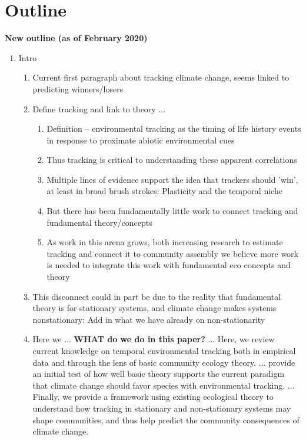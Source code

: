 \documentclass[11pt,letterpaper]{article}
\begin{document}
\newpage
\section{Outline}


{\bf New outline (as of February 2020)} 
\begin{enumerate}
\item Intro
\begin{enumerate}
\item Current first paragraph about tracking climate change, seems linked to predicting winners/losers 
\item Define tracking and link to theory ... 
\begin{enumerate}
\item Definition -- environmental tracking as the timing of life history events in response to proximate abiotic environmental cues \item Thus tracking is critical to understanding these apparent correlations
\item Multiple lines of evidence support the idea that trackers should 'win', at least in broad brush strokes: Plasticity and the temporal niche
\item But there has been fundamentally little work to connect tracking and fundamental theory/concepts
\item As work in this arena grows, both increasing research to estimate tracking and connect it to community assembly we believe more work is needed to integrate this work with fundamental eco concepts and theory 
\end{enumerate}
\item This disconnect could in part be due to the reality that fundamental theory is for stationary systems, and climate change makes systems nonstationary: Add in what we have already on non-stationarity
\item Here we ... {\bf WHAT do we do in this paper?} ... Here, we review current knowledge on temporal environmental tracking both in empirical data and through the lens of basic community ecology theory. ... provide an initial test of how well basic theory supports the current paradigm that climate change should favor species with environmental tracking. ... Finally, we provide a framework using existing ecological theory to understand how tracking in stationary and non-stationary systems may shape communities, and thus help predict the community consequences of climate change. 
\end{enumerate}

\end{enumerate}
\end{document}
